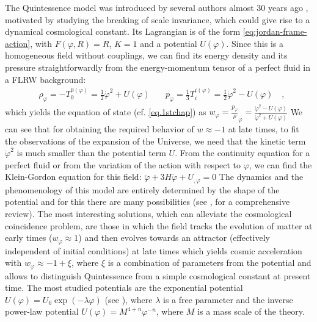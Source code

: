The Quintessence model
was introduced by several authors almost 30 years
ago ,
motivated by studying the 
breaking of scale invariance, which could give rise to a dynamical cosmological constant.
Its Lagrangian is of the form \cref{eq:jordan-frame-action}, with
$F(\varphi, R) = R$, $K = 1$ and a potential $U(\varphi)$.
Since this is a homogeneous field without couplings, we can find its energy density and its pressure 
straightforwardly from the energy-momentum tensor of a perfect fluid in a FLRW background:
\begin{align}
&\rho_{\varphi} = -T^{0 (\varphi)}_0 = \frac{1}{2}\dot\varphi^2 + U(\varphi) \quad 
&p_{\varphi} = \frac{1}{3} T^{i (\varphi)}_i = \frac{1}{2}\dot\varphi^2 - U(\varphi) \quad ,
\end{align}
which yields the equation of state (cf. \cref{eq.1stchap}) as
\beeqp$
w_\varphi  = \frac{p_{\varphi}}\rho_{\varphi} = \frac{\dot\varphi^2 - U(\varphi)}{\dot\varphi^2 + U(\varphi)}
$
We can see that for obtaining the required behavior of $w\approx -1$ at late times, to fit 
the observations of the expansion of the Universe, we need that the kinetic term $\dot\varphi^2$
is much smaller than the potential term $U$.
From the continuity equation for a perfect fluid or from the variation of the action with respect to $\varphi$,
we can find the Klein-Gordon equation for this field:
\beeqp$
\label{eq:Klein-Gordon-Quintessence}
\ddot \varphi + 3 H \dot \varphi + U_{,\varphi} = 0
$
The dynamics and the phenomenology of this model are entirely determined by the shape of the potential
and for this there are many possibilities (see \cite[chap. 7]{amendola_dark_2010}, for a comprehensive review).
The most interesting solutions, which can alleviate the cosmological coincidence problem, are those in which the field
tracks the evolution of matter at early times ($w_\varphi \approx 1$) and then 
evolves towards an attractor (effectively independent of initial conditions) 
at late times which yields cosmic acceleration with $w_\varphi \approx -1+\xi$,
where $\xi$ is a combination of parameters from the potential and allows
to distinguish Quintessence from a simple cosmological constant at present time.
The most studied potentials are the exponential potential $U(\varphi) = U_0\exp(-\lambda \varphi)$ 
(see \cite{cite copeland, wetterich}), where $\lambda$ is a free parameter
and the inverse power-law potential $U(\varphi) = M^{4+n} \varphi^{-n}$,
where $M$ is a mass scale of the theory.

